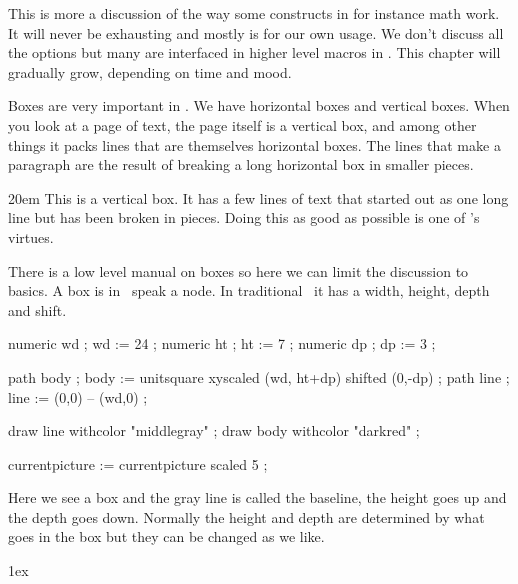 \startsubject[title=Contents]
    \setups[sectioncontents]
\stopsubject

\startsection[title={Introduction}]

This is more a discussion of the way some constructs in for instance math work.
It will never be exhausting and mostly is for our own usage. We don't discuss all
the options but many are interfaced in higher level macros in \CONTEXT. This
chapter will gradually grow, depending on time and mood.

\stopsection

\startsection[title=Boxes]

Boxes are very important in \TEX. We have horizontal boxes and vertical boxes.
When you look at a page of text, the page itself is a vertical box, and among
other things it packs lines that are themselves horizontal boxes. The lines that
make a paragraph are the result of breaking a long horizontal box in smaller
pieces.

\startlinecorrection
{} \bgroup \hsize 20em \showmakeup[line] \showboxes
    This is a vertical box. It has a few lines of text that started out as
    one long line but has been broken in pieces. Doing this as good as possible
    is one of \TEX's virtues.
\egroup
\stoplinecorrection

There is a low level manual on boxes so here we can limit the discussion to
basics. A box is in \TEX\ speak a node. In traditional \TEX\ it has a
width, height, depth and shift.

\startlinecorrection
\startMPcode
    numeric wd ; wd := 24 ;
    numeric ht ; ht :=  7 ;
    numeric dp ; dp :=  3 ;

    path body ; body := unitsquare xyscaled (wd, ht+dp) shifted (0,-dp) ;
    path line ; line := (0,0) -- (wd,0) ;

    draw line withcolor "middlegray" ;
    draw body withcolor "darkred" ;

    currentpicture := currentpicture scaled 5 ;
\stopMPcode
\stoplinecorrection

Here we see a box and the gray line is called the baseline, the height goes up
and the depth goes down. Normally the height and depth are determined by what
goes in the box but they can be changed as we like.

\startbuffer
\setbox\scratchboxone{}
\setbox\scratchboxtwo{}

\boxshift\scratchboxtwo 1ex \dontleavehmode \box\scratchboxone\box\scratchboxtwo

